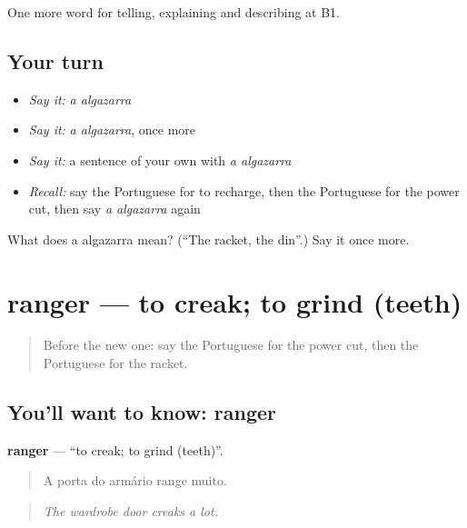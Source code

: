 \begin{grammarlens}[title={What you've built}]
One more word for telling, explaining and describing at B1.
\end{grammarlens}

\subsection*{Your turn}
\begin{itemize}
\raggedright
  \item \emph{Say it:} \emph{a algazarra}
  \item \emph{Say it:} \emph{a algazarra}, once more
  \item \emph{Say it:} a sentence of your own with \emph{a algazarra}
  \item \emph{Recall:} say the Portuguese for to recharge, then the Portuguese for the power cut, then say \emph{a algazarra} again
\end{itemize}

\begin{tcolorbox}[breakable,colback=teal!4,colframe=teal!35!black,title={Before you move on}]
What does a algazarra mean? (\textquotedblleft{}The racket, the din\textquotedblright{}.) Say it once more.
\end{tcolorbox}
\section[ranger]{ranger — to creak; to grind (teeth)}

\label{lesson:PT-C433-ranger}



\begin{quote}
Before the new one: say the Portuguese for the power cut, then the Portuguese for the racket.
\end{quote}

\subsection*{You'll want to know: ranger}
\textbf{ranger} — \textquotedblleft{}to creak; to grind (teeth)\textquotedblright{}.

\begin{quote}
A porta do armário range muito.
\end{quote}

\begin{quote}
\emph{The wardrobe door creaks a lot.}
\end{quote}

